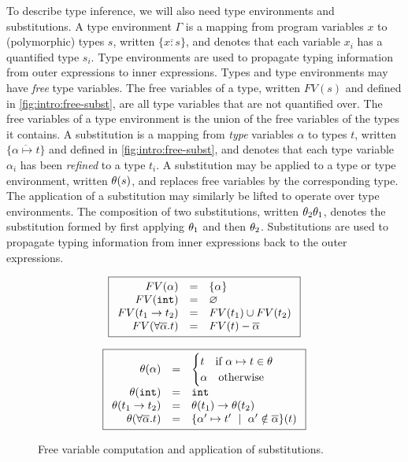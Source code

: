 To describe type inference, we will also need type environments and
substitutions.
%
A type environment $\Gamma$ is a mapping from program variables $x$ to
(polymorphic) types $s$, written $\{\overline{x:s}\}$, and denotes that
each variable $x_i$ has a quantified type $s_i$.
%
Type environments are used to propagate typing information from outer
expressions to inner expressions. %
%
Types and type environments may have \emph{free} type variables.
%
The free variables of a type, written $FV(s)$ and defined in
\autoref{fig:intro:free-subst}, are all type variables that are not
quantified over. %
%
The free variables of a type environment is the union of the free variables
of the types it contains. %
%
A substitution is a mapping from \emph{type} variables $\alpha$ to types
$t$, written $\{\overline{\alpha \mapsto t}\}$ and defined in
\autoref{fig:intro:free-subst}, and denotes that each type variable
$\alpha_i$ has been \emph{refined} to a type $t_i$.
%
A substitution may be applied to a type or type environment, written
$\theta(s)$, and replaces free variables by the corresponding type.
%
The application of a substitution may similarly be lifted to operate
over type environments.
%
The composition of two substitutions, written $\theta_2\theta_1$, denotes
the substitution formed by first applying $\theta_1$ and then $\theta_2$.
%
Substitutions are used to propagate typing information from inner expressions
back to the outer expressions.

\begin{figure}[t]
\centering
\begin{minipage}[c]{0.49\textwidth}
\[
\boxed{
\begin{array}{rcl}
FV(\alpha) &=& \{\alpha\} \\
FV(\mathtt{int})  &=& \varnothing \\
FV(t_1 \rightarrow t_2) &=& FV(t_1) \cup FV(t_2)\\
FV(\forall \overline{\alpha}. t) &=& FV(t) - \overline{\alpha}
\end{array}
}
\]
\end{minipage}
\begin{minipage}[c]{0.49\textwidth}
\[
\boxed{
\begin{array}{rcl}
\theta(\alpha) &=& \begin{cases}
  t \quad \text{if } \alpha \mapsto t \in \theta \\
  \alpha \quad \text{otherwise}
  \end{cases} \\
\theta(\mathtt{int})  &=& \mathtt{int} \\
\theta(t_1 \rightarrow t_2) &=& \theta(t_1) \rightarrow \theta(t_2)\\
\theta(\forall \overline{\alpha}. t) &=& \{\alpha' \mapsto t' \ \mid\  \alpha' \notin \overline{\alpha}\}(t)
\end{array}
}
\]
\end{minipage}
\caption{Free variable computation and application of substitutions.}
\label{fig:intro:free-subst}
\end{figure}

